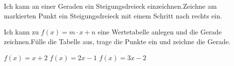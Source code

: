 \begin{aufgabe}{Ich kann an einer Geraden ein Steigungsdreieck einzeichnen.\newline Zeichne am markierten Punkt ein Steigungsdreieck mit einem Schritt nach rechts ein.}
\noindent\begin{minipage}[t]{0.24\linewidth}
\begin{teile}\teil\end{teile}
\begin{ksys}[xmin=-2,xmax=2,ymin=-3,ymax=3,ablesen]
\end{ksys}
\end{minipage}\hfill
\begin{minipage}[t]{0.24\linewidth}
\begin{teile}\teil\end{teile}
\begin{ksys}[xmin=-2,xmax=2,ymin=-3,ymax=3,ablesen]
\end{ksys}
\end{minipage}\hfill
\begin{minipage}[t]{0.24\linewidth}
\begin{teile}\teil\end{teile}
\begin{ksys}[xmin=-2,xmax=2,ymin=-3,ymax=3,ablesen]
\end{ksys}
\end{minipage}\hfill
\begin{minipage}[t]{0.24\linewidth}
\begin{teile}\teil\end{teile}
\begin{ksys}[xmin=-2,xmax=2,ymin=-3,ymax=3,ablesen]
\end{ksys}
\end{minipage}
\end{aufgabe}


\begin{aufgabe}{Ich kann zu $f(x) = m \cdot x + n$ eine Wertetabelle anlegen und die Gerade zeichnen.\newline Fülle die Tabelle aus, trage die Punkte ein und zeichne die Gerade.}
\noindent\begin{minipage}[t]{0.6\linewidth}\vspace{0pt}
\begin{teile}
\teil $f(x) = x + 2$ \quad {}
\teil $f(x) = 2x - 1$ \quad {}
\teil $f(x) = 3x - 2$ \quad {}
\end{teile}
\end{minipage}\hfill
\begin{minipage}[t]{0.38\linewidth}\vspace{0pt}
\begin{ksys}[xmin=-3,xmax=3,ymin=-5,ymax=5]
\end{ksys}
\end{minipage}
\end{aufgabe}

